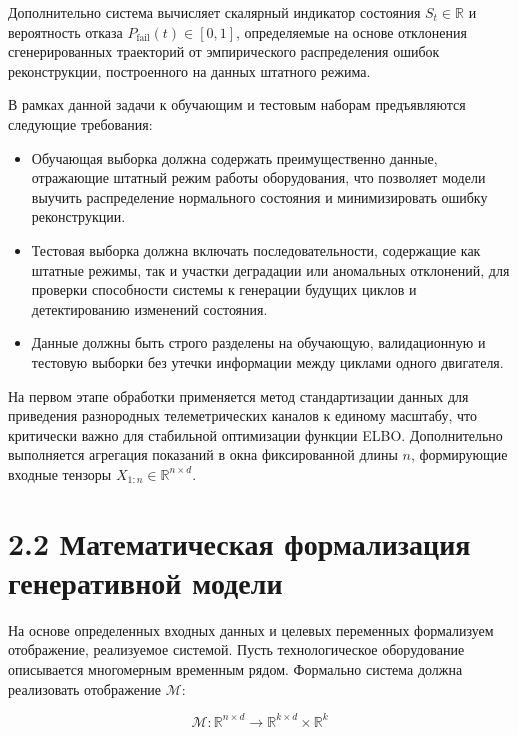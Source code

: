 \documentclass[14pt, a4paper, oneside]{extreport}
\begin{document}
Дополнительно система вычисляет скалярный индикатор состояния $S_t \in \mathbb{R}$ и вероятность отказа $P_{\text{fail}}(t) \in [0, 1]$, определяемые на основе отклонения сгенерированных траекторий от эмпирического распределения ошибок реконструкции, построенного на данных штатного режима.

В рамках данной задачи к обучающим и тестовым наборам предъявляются следующие требования:
\begin{itemize}
\item Обучающая выборка должна содержать преимущественно данные, отражающие штатный режим работы оборудования, что позволяет модели выучить распределение нормального состояния и минимизировать ошибку реконструкции.
\item Тестовая выборка должна включать последовательности, содержащие как штатные режимы, так и участки деградации или аномальных отклонений, для проверки способности системы к генерации будущих циклов и детектированию изменений состояния.
\item Данные должны быть строго разделены на обучающую, валидационную и тестовую выборки без утечки информации между циклами одного двигателя.
\end{itemize}

На первом этапе обработки применяется метод стандартизации данных для приведения разнородных телеметрических каналов к единому масштабу, что критически важно для стабильной оптимизации функции ELBO. Дополнительно выполняется агрегация показаний в окна фиксированной длины $n$, формирующие входные тензоры $X_{1:n} \in \mathbb{R}^{n \times d}$.



\vspace{1em}
\section{2.2 Математическая формализация генеративной модели}
\vspace{1em}

На основе определенных входных данных и целевых переменных формализуем отображение, реализуемое системой. Пусть технологическое оборудование описывается многомерным временным рядом. Формально система должна реализовать отображение $\mathcal{M}$:

\begin{equation}
\mathcal{M}: \mathbb{R}^{n \times d} \rightarrow \mathbb{R}^{k \times d} \times \mathbb{R}^k
\label{eq:mapping}
\end{equation}
\end{document}
